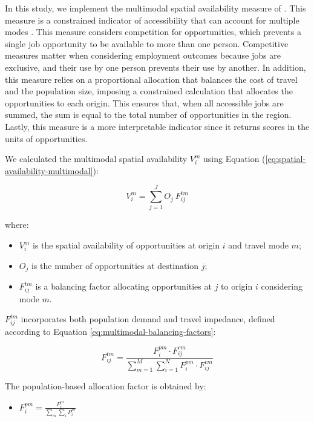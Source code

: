 \documentclass[preprint, 3p,
authoryear]{elsarticle} %
\providecommand{\tightlist}{%
  \setlength{\itemsep}{0pt}\setlength{\parskip}{0pt}}
\begin{document}
In this study, we implement the multimodal spatial availability measure
of \citet{soukhov2024}. This measure is a constrained indicator of
accessibility that can account for multiple modes
\citep[see][]{soukhov2023, soukhov2025}. This measure considers
competition for opportunities, which prevents a single job opportunity
to be available to more than one person. Competitive measures matter
when considering employment outcomes because jobs are exclusive, and
their use by one person prevents their use by another. In addition, this
measure relies on a proportional allocation that balances the cost of
travel and the population size, imposing a constrained calculation that
allocates the opportunities to each origin. This ensures that, when all
accessible jobs are summed, the sum is equal to the total number of
opportunities in the region. Lastly, this measure is a more
interpretable indicator since it returns scores in the units of
opportunities.

We calculated the multimodal spatial availability \(V_i^m\) using
Equation (\ref{eq:spatial-availability-multimodal}):

\begin{equation}
\label{eq:spatial-availability-multimodal}
V^m_{i} = \sum_{j=1}^J O_j\ F^{tm}_{ij}
\end{equation}

where:

\begin{itemize}
\tightlist
\item
  \(V^m_{i}\) is the spatial availability of opportunities at origin
  \(i\) and travel mode \(m\);
\item
  \(O_j\) is the number of opportunities at destination \(j\);
\item
  \(F^{tm}_{ij}\) is a balancing factor allocating opportunities at
  \(j\) to origin \(i\) considering mode \(m\).
\end{itemize}

\(F^{tm}_{ij}\) incorporates both population demand and travel
impedance, defined according to Equation
\ref{eq:multimodal-balancing-factors}:

\begin{equation}
\label{eq:multimodal-balancing-factors}
F^{tm}_{ij} = \frac{F^{pm}_{i} \cdot F^{cm}_{ij}}{\sum_{m=1}^M \sum_{i=1}^N F^{pm}_{i} \cdot F^{cm}_{ij}}
\end{equation}

The population-based allocation factor is obtained by:

\begin{itemize}
\tightlist
\item
  \(F^{pm}_{i} = \frac{P_{i}^m}{\sum_{m}\sum_{i} P_{i}^m}\)
\end{itemize}
\end{document}

